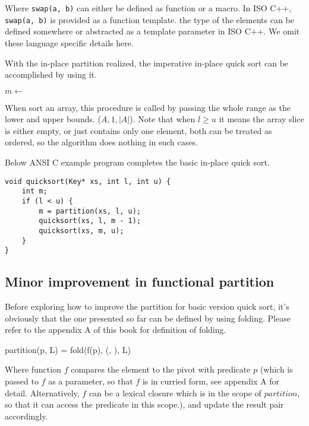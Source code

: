\documentclass[UTF8]{article}
\begin{document}
Where \verb|swap(a, b)| can either be defined as function or a macro. In ISO C++, \verb|swap(a, b)|
is provided as a function template. the type of the elements can be defined somewhere or abstracted
as a template parameter in ISO C++. We omit these language specific details here.

With the in-place partition realized, the imperative in-place quick sort can be accomplished by using it.

\begin{algorithmic}[1]
    \State $m \gets$ 
    \State {}
    \State {}
  \EndIf
\EndProcedure
\end{algorithmic}

When sort an array, this procedure is called by passing the whole range as the lower and upper bounds.
($A, 1, |A|$). Note that when $l \geq u$ it means the array slice is either empty,
or just contains only one element, both can be treated as ordered, so
the algorithm does nothing in such cases.

Below ANSI C example program completes the basic in-place quick sort.

\lstset{language=C}
\begin{lstlisting}
void quicksort(Key* xs, int l, int u) {
    int m;
    if (l < u) {
        m = partition(xs, l, u);
        quicksort(xs, l, m - 1);
        quicksort(xs, m, u);
    }
}
\end{lstlisting}

\subsection{Minor improvement in functional partition}
Before exploring how to improve the partition for basic version quick sort, it's obviously that the
one presented so far can be defined by using folding. Please refer to the appendix A of this book for
definition of folding.

\be
partition(p, L) = fold(f(p), (\Phi, \Phi), L)
\ee

Where function $f$ compares the element to the pivot with predicate $p$ (which is passed to $f$ as a parameter, so that
$f$ is in curried form, see appendix A for detail. Alternatively, $f$ can be a lexical closure which is in
the scope of $partition$, so that it can access the predicate in this scope.),
and update the result pair accordingly.
\end{document}
